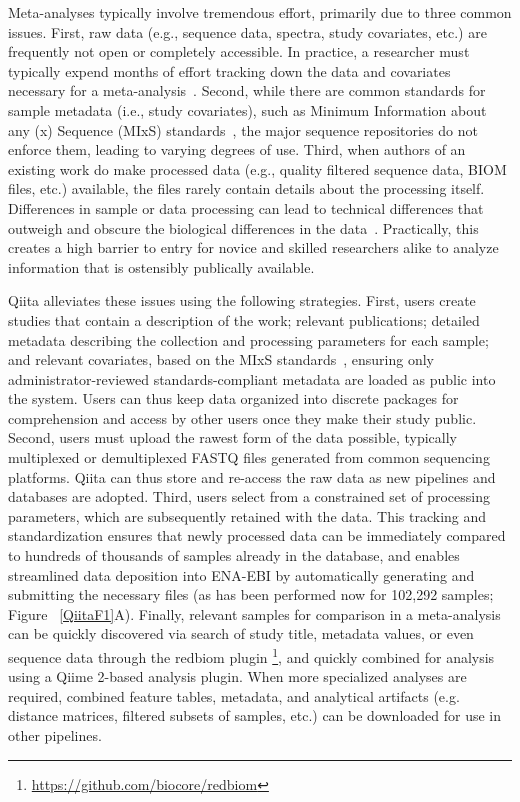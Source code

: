 Meta-analyses typically involve tremendous effort, primarily due to three common
issues. First, raw data (e.g., sequence data, spectra, study covariates, etc.) are
frequently not open or completely accessible. In practice, a researcher must typically
expend months of effort tracking down the data and covariates necessary for a
meta-analysis~\cite{Langille2018}. Second, while there are common standards for
sample metadata (i.e., study covariates), such as Minimum Information about any (x)
Sequence (MIxS) standards~\cite{Yilmaz2011}, the major sequence repositories do not
enforce them, leading to varying degrees of use. Third, when authors of an existing
work do make processed data (e.g., quality filtered sequence data, BIOM files, etc.)
available, the files rarely contain details about the processing itself. Differences
in sample or data processing can lead to technical differences that outweigh and
obscure the biological differences in the data~\cite{Debelius2016, Sinha2017}.
Practically, this creates a high barrier to entry for novice and skilled researchers
alike to analyze information that is ostensibly publically available.

Qiita alleviates these issues using the following strategies. First, users create
studies that contain a description of the work; relevant publications; detailed
metadata describing the collection and processing parameters for each sample; and
relevant covariates, based on the MIxS standards~\cite{Yilmaz2011}, ensuring only
administrator-reviewed standards-compliant metadata are loaded as public into the
system. Users can thus keep data organized into discrete packages for comprehension
and access by other users once they make their study public. Second, users must
upload the rawest form of the data possible, typically multiplexed or demultiplexed
FASTQ files generated from common sequencing platforms. Qiita can thus store and
re-access the raw data as new pipelines and databases are adopted. Third, users select
from a constrained set of processing parameters, which are subsequently retained with
the data. This tracking and standardization ensures that newly processed data can be
immediately compared to hundreds of thousands of samples already in the database,
and enables streamlined data deposition into ENA-EBI by automatically generating
and submitting the necessary files (as has been performed now for 102,292 samples; Figure ~\ref{QiitaF1}A).
Finally, relevant samples for comparison in a meta-analysis can be quickly discovered
via search of study title, metadata values, or even sequence data through the redbiom
plugin \footnote{\url{https://github.com/biocore/redbiom}}, and quickly combined
for analysis using a Qiime 2-based analysis plugin. When more specialized analyses
are required, combined feature tables, metadata, and analytical artifacts (e.g.
distance matrices, filtered subsets of samples, etc.) can be downloaded for use
in other pipelines.

